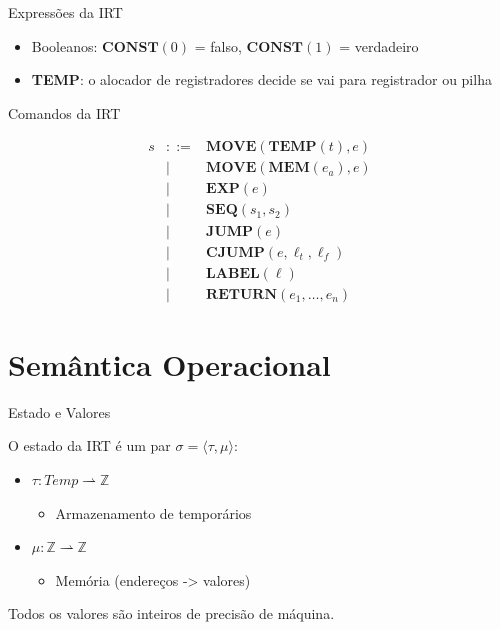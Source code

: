 \begin{frame}{Expressões da IRT}

    \begin{itemize}

        \item
        Booleanos: \(\mathbf{CONST}(0)\) = falso, \(\mathbf{CONST}(1)\) =
        verdadeiro
        \item
        \textbf{TEMP}: o alocador de registradores decide se vai para
        registrador ou pilha
    \end{itemize}
\end{frame}

\begin{frame}{Comandos da IRT}

    \[\begin{array}{lcll}
    s & ::= & \mathbf{MOVE}(\mathbf{TEMP}(t), e) \\
    & \mid & \mathbf{MOVE}(\mathbf{MEM}(e_a), e) \\
    & \mid & \mathbf{EXP}(e) \\
    & \mid & \mathbf{SEQ}(s_1, s_2) \\
    & \mid & \mathbf{JUMP}(e) \\
    & \mid & \mathbf{CJUMP}(e, \ell_t, \ell_f) \\
    & \mid & \mathbf{LABEL}(\ell) \\
    & \mid & \mathbf{RETURN}(e_1, \ldots, e_n)
\end{array}\]
\end{frame}


\section{Semântica Operacional}\label{semuxe2ntica-operacional}

\begin{frame}{Estado e Valores}

    O estado da IRT é um par \(\sigma = \langle \tau, \mu \rangle\):

    \begin{itemize}

        \item
        \(\tau : \mathit{Temp} \rightharpoonup \mathbb{Z}\)

        \begin{itemize}

            \item
            Armazenamento de temporários
        \end{itemize}
        \item
        \(\mu : \mathbb{Z} \rightharpoonup \mathbb{Z}\)

        \begin{itemize}

            \item
            Memória (endereços -> valores)
        \end{itemize}
    \end{itemize}

    Todos os valores são inteiros de precisão de máquina.
\end{frame}

